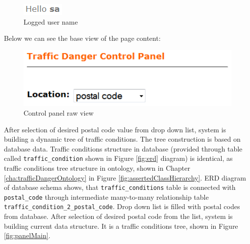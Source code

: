 \medskip

\begin{figure}[htp]
\centering
\includegraphics[scale=0.6]{images/chapter4/PanelTopRight}
\caption{Logged user name}
\label{fig:panelTopRight}
\end{figure}

\noindent Below we can see the base view of the page content:

\medskip

\begin{figure}[htp]
\centering
\includegraphics[scale=0.6]{images/chapter4/PanelTopLeft}
\caption{Control panel raw view}
\label{fig:panelTopLeft}
\end{figure}

\noindent After selection of desired postal code value from drop down list, system is building a dynamic tree of traffic conditions. The tree construction is based on database data. Traffic conditions structure in database (provided through table called \texttt{traffic\_condition} shown in Figure \ref{fig:erd} diagram) is identical, as traffic conditions tree structure in ontology, shown in Chapter \ref{cha:trafficDangerOntology} in Figure \ref{fig:assertedClassHierarchy}. ERD diagram of database schema shows, that \texttt{traffic\_conditions} table is connected with \texttt{postal\_code} through intermediate many-to-many relationship table \texttt{traffic\_condition\_2\_postal\_code}. Drop down list is filled with postal codes from database. After selection of desired postal code from the list, system is building current data structure. It is a traffic conditions tree, shown in Figure \ref{fig:panelMain}.

\newpage

